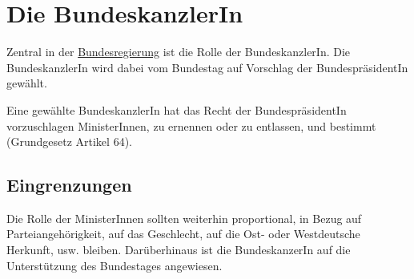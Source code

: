 \documentclass{article}
\begin{document}
\section{Die BundeskanzlerIn} 
Zentral in der \hyperref[Die Bundesregierung]{Bundesregierung} ist die Rolle der BundeskanzlerIn. Die BundeskanzlerIn wird dabei vom Bundestag auf Vorschlag der BundespräsidentIn gewählt.
 
Eine gewählte BundeskanzlerIn hat das Recht der BundespräsidentIn vorzuschlagen MinisterInnen, zu ernennen oder zu entlassen, und bestimmt  (Grundgesetz Artikel 64).
 
\subsection{Eingrenzungen} Die Rolle der MinisterInnen sollten weiterhin proportional, in Bezug auf Parteiangehörigkeit, auf das Geschlecht, auf die Ost- oder Westdeutsche Herkunft, usw. bleiben. Darüberhinaus ist die BundeskanzerIn auf die Unterstützung des Bundestages angewiesen. 
\end{document}
